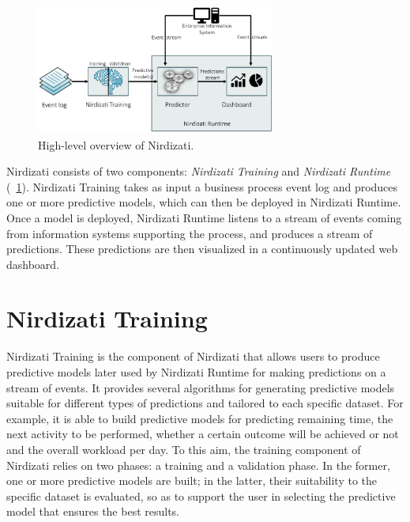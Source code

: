 \documentclass[runningheads,a4paper]{llncs}
\begin{document}
\begin{figure}[t]%
	\centering
	\includegraphics[width=0.7\textwidth]{img/nirdizati-overall}
	\caption{High-level overview of Nirdizati.}
	\label{fig:nirdizati-overall}
\end{figure}



Nirdizati consists of two components: \textit{Nirdizati Training} and \textit{Nirdizati Runtime} (\figurename~\ref{fig:nirdizati-overall}). Nirdizati Training takes as input a business process event log and produces one or more predictive models, which can then be deployed in Nirdizati Runtime. Once a model is deployed, Nirdizati Runtime listens to a stream of events coming from information systems supporting the process, and produces a stream of predictions. These predictions are then visualized in a continuously updated web dashboard.

\section{Nirdizati Training} \label{sec:training}
Nirdizati Training is the component of Nirdizati that allows users to produce predictive models later used by
Nirdizati Runtime for making predictions on a stream of events. It provides several algorithms for generating
predictive models suitable for different types of predictions and tailored to each specific dataset.
For example, it is able to build predictive models for predicting remaining time, the next activity to be
performed, whether a certain outcome will be achieved or not and the overall workload per day.
%
To this aim, the training component of Nirdizati relies on two phases: a training and a validation phase.
In the former, one or more predictive models are built; in the latter, their suitability to the specific
dataset is evaluated, so as to support the user in selecting the predictive model that ensures the best results.
\end{document}
